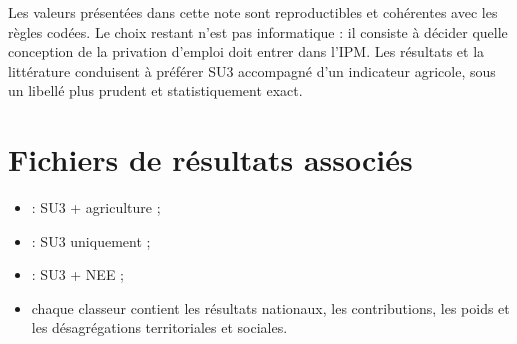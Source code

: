 \documentclass[11pt,a4paper]{article}
\begin{document}
\begin{retenir}[Conclusion]
Les valeurs présentées dans cette note sont reproductibles et cohérentes avec les règles codées.
Le choix restant n'est pas informatique : il consiste à décider quelle conception de la
privation d'emploi doit entrer dans l'IPM. Les résultats et la littérature conduisent à préférer
SU3 accompagné d'un indicateur agricole, sous un libellé plus prudent et statistiquement exact.
\end{retenir}

\section*{Fichiers de résultats associés}

\begin{itemize}
  \item {} : SU3 + agriculture ;
  \item {} : SU3 uniquement ;
  \item {} : SU3 + NEE ;
  \item chaque classeur contient les résultats nationaux, les contributions, les poids et les
  désagrégations territoriales et sociales.
\end{itemize}
\end{document}
